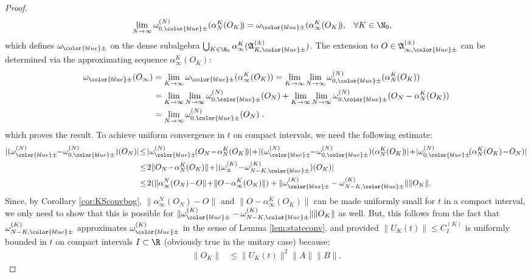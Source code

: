 \documentclass[a4paper, 11pt]{article}
\newcommand{\fA}{\mathfrak{A}}\newcommand{\cA}{\mathcal{A}}\newcommand{\dA}{\mathds{A}}\newcommand{\sA}{\mathscr{A}}
\DeclareMathOperator{\1}{\mathds{1}}
\begin{document}
\begin{proof}
\begin{align*}
\lim_{N\rightarrow\infty}\omega^{(N)}_{0,{\color{blue}\pm}}(\alpha^{K}_{N}(O_{K})\!) & = \omega_{{\color{blue}\pm}}(\alpha^{K}_{\infty}(O_{K})\!), & \forall K&\in\N_{0},
\end{align*}
which defines $\omega_{{\color{blue}\pm}}$ on the dense subalgebra $\bigcup_{K\in\N_{0}}\alpha^{K}_{\infty}(\fA^{(\pm)}_{K,{\color{blue}\pm}})$. The extension to $O\in\fA^{(\pm)}_{\infty,{\color{blue}\pm}}$ can be determined via the approximating sequence $\alpha^{K}_{\infty}(O_{K})$:
\begin{align*}
\omega_{{\color{blue}\pm}}(O_{\infty}) & = \lim_{K\rightarrow\infty}\omega_{{\color{blue}\pm}}(\alpha^{K}_{\infty}(O_{K})) = \lim_{K\rightarrow\infty}\lim_{N\rightarrow\infty}\omega^{(N)}_{0,{\color{blue}\pm}}(\alpha^{K}_{N}(O_{K})) \\
& = \lim_{K\rightarrow\infty}\lim_{N\rightarrow\infty}\omega^{(N)}_{0,{\color{blue}\pm}}(O_{N}) + \lim_{K\rightarrow\infty}\lim_{N\rightarrow\infty}\omega^{(N)}_{0,{\color{blue}\pm}}(O_{N}-\alpha^{K}_{N}(O_{K})) \\
& = \lim_{N\rightarrow\infty}\omega^{(N)}_{0,{\color{blue}\pm}}(O_{N})\;.
\end{align*}
which proves the result. To achieve uniform convergence in $t$ on compact intervals, we need the following estimate:
\begin{align*}
|(\omega^{(N)}_{{\color{blue}\pm}}\!\!-\!\omega^{(N)}_{0,{\color{blue}\pm}})(O_{N})| & \!\leq\!|\omega^{(N)}_{{\color{blue}\pm}}\!(O_{N}\!-\!\alpha^{K}_{N}(O_{K})\!)|\!+\!|(\omega^{(N)}_{{\color{blue}\pm}}\!\!-\!\omega^{(N)}_{0,{\color{blue}\pm}})(\alpha^{K}_{N}(O_{K})\!)|\!+\!|\omega^{(N)}_{0,{\color{blue}\pm}}\!(\alpha^{K}_{N}(O_{K})\!-\!O_{N})| \\ 
 & \!\leq\! 2\|O_{N}\!-\!\alpha^{K}_{N}(O_{K})\|\!+\!|(\omega^{(K)}_{\pm}\!-\!\omega^{(K)}_{N-K,{\color{blue}\pm}})(O_{K})| \\
 & \!\leq\! 2(\|\alpha^{N}_{\infty}(O_{N})\!-\!O\|\!+\!\|O\!-\!\alpha^{K}_{\infty}(O_{K})\|)+\|\omega^{(K)}_{{\color{blue}\pm}}-\omega^{(K)}_{N-K,{\color{blue}\pm}}\|\|O_{K}\|.
\end{align*}
Since, by Corollary \ref{cor:KSconvbog}, $\|\alpha^{N}_{\infty}(O_{N})-O\|$ and $\|O-\alpha^{K}_{\infty}(O_{K})\|$ can be made uniformly small for $t$ in a compact interval, we only need to show that this is possible for $\|\omega^{(K)}_{{\color{blue}\pm}}-\omega^{(K)}_{N-K,{\color{blue}\pm}}\|\|O_{K}\|$ as well. But, this follows from the fact that $\omega^{(K)}_{N-K,{\color{blue}\pm}}$ approximates $\omega^{(K)}_{{\color{blue}\pm}}$ in the sense of Lemma \ref{lem:stateconv}, and provided $\|U_{K}(t)\|\leq C^{(K)}_{I}$ is uniformly bounded in $t$ on compact intervals $I\subset\R$ (obviously true in the unitary case) because:
\begin{align*}
\|O_{K}\| & \leq \|U_{K}(t)\|^{2}\|A\|\|B\|.
\end{align*}
\end{proof}
\end{document}
